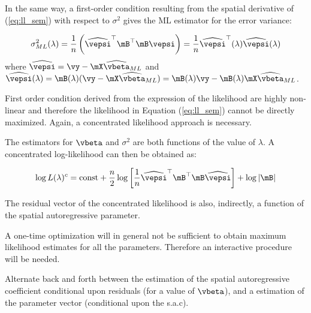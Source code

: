 \documentclass[english,12pt]{book}\usepackage[]{graphicx}\usepackage[]{xcolor}
\begin{document}
In the same way, a first-order condition resulting from the spatial derivative of (\ref{eq:ll_sem}) with respect to $\sigma^2$ gives the ML estimator for the error variance:

\begin{equation}
	\sigma^2_{ML}(\lambda) = \frac{1}{n}\left(\widehat{\vepsi}^\top\mB^\top\mB \vepsi\right)= \frac{1}{n}\widehat{\vepsi}^\top(\lambda)\widehat{\vepsi}(\lambda)
\end{equation}
%
where $\widehat{\vepsi} = \vy - \mX\widehat{\vbeta}_{ML}$ and $\widehat{\vepsi}(\lambda) = \mB(\lambda)(\vy - \mX\widehat{\vbeta}_{ML}) = \mB(\lambda)\vy - \mB(\lambda)\mX\widehat{\vbeta}_{ML}$. 


First order condition derived from the expression of the likelihood are highly non-linear and therefore the likelihood in Equation (\ref{eq:ll_sem}) cannot be directly maximized. Again, a concentrated likelihood approach is necessary.

The estimators for $\vbeta$ and $\sigma^2$ are both functions of the value of $\lambda$. A concentrated log-likelihood can then be obtained as:


\begin{equation}
	\log L(\lambda)^c= \mbox{const} + \frac{n}{2}\log\left[\frac{1}{n}\widehat{\vepsi}^\top\mB^\top\mB \widehat{\vepsi}\right] + \log\left|\mB\right|
\end{equation}

The residual vector of the concentrated likelihood is also, indirectly, a function of the spatial autoregressive parameter.

A one-time optimization will in general not be sufficient to obtain maximum likelihood estimates for all the parameters. Therefore an interactive procedure will be needed.

Alternate back and forth between the estimation of the spatial autoregressive coefficient conditional upon residuals (for a value of $\vbeta$), and a estimation of the parameter vector (conditional upon the s.a.c). 
\end{document}
